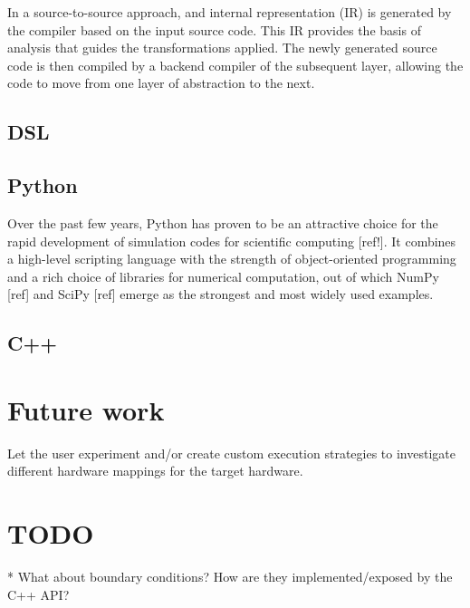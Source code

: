 \documentclass[english]{article}
\begin{document}
In a source-to-source approach, and internal representation (IR) is generated by the compiler based on the input source code.
This IR provides the basis of analysis that guides the transformations applied.
The newly generated source code is then compiled by a backend compiler of the subsequent layer, allowing the code to move from one layer of abstraction to the next.


\subsection{DSL}

\subsection{Python}
Over the past few years, Python has proven to be an attractive choice for the rapid development of simulation codes for scientific computing [ref!].
It combines a high-level scripting language with the strength of object-oriented programming and a rich choice of libraries for numerical computation, out of which NumPy [ref] and SciPy [ref] emerge as the strongest and most widely used examples.

\subsection{C++}

\section{Future work}
Let the user experiment and/or create custom execution strategies to investigate different hardware mappings for the target hardware.

\section{TODO}
* What about boundary conditions? How are they implemented/exposed by the C++ API?
\end{document}
